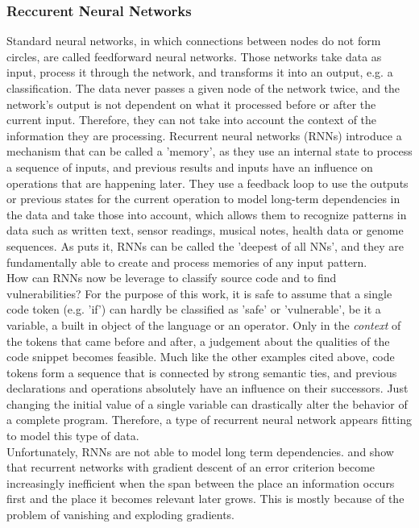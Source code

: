 \documentclass[
	a4paper,
	pagesize,
	pdftex,
	12pt,
	twoside, %
	BCOR=5mm, %
	ngerman,
	fleqn,
	final,
	]{scrartcl}
\begin{document}
\subsubsection{Reccurent Neural Networks}\label{RNN}
Standard neural networks, in which connections between nodes do not form circles, are called feedforward neural networks. Those networks take data as input, process it through the network, and transforms it into an output, e.g. a classification. The data never passes a given node of the network twice, and the network's output is not dependent on what it processed before or after the current input. Therefore, they can not take into account the context of the information they are processing. Recurrent neural networks (RNNs) introduce a mechanism that can be called a 'memory', as they use an internal state to process a sequence of inputs, and previous results and inputs have an influence on operations that are happening later. They use a feedback loop to use the outputs or previous states for the current operation to model long-term dependencies in the data and take those into account, which allows them to recognize patterns in data such as written text, sensor readings, musical notes, health data or genome sequences. As \cite{Schmidthuber.2015} puts it, RNNs can be called the 'deepest of all NNs', and they are fundamentally able to create and process memories of any input pattern.\\
How can RNNs now be leverage to classify source code and to find vulnerabilities? For the purpose of this work, it is safe to assume that a single code token (e.g. 'if') can hardly be classified as 'safe' or 'vulnerable', be it a variable, a built in object of the language or an operator. Only in the \textit{context} of the tokens that came before and after, a judgement about the qualities of the code snippet becomes feasible. Much like the other examples cited above, code tokens form a sequence that is connected by strong semantic ties, and previous declarations and operations absolutely have an influence on their successors. Just changing the initial value of a single variable can drastically alter the behavior of a complete program. Therefore, a type of recurrent neural network appears fitting to model this type of data.\\
Unfortunately, RNNs are not able to model long term dependencies. \cite{Hochreiter.1991} and \cite{Bengio.1994} show that recurrent networks with gradient descent of an error criterion become increasingly inefficient when the span between the place an information occurs first and the place it becomes relevant later grows. This is mostly because of the problem of vanishing and exploding gradients.\\
\end{document}
